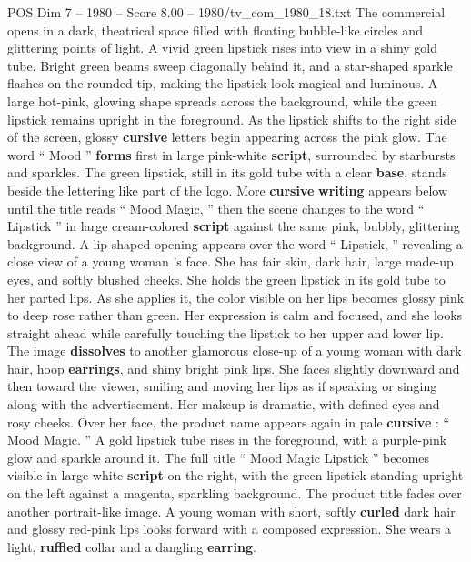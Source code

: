 \begin{textsample}{POS Dim 7 – 1980 – Score 8.00 – 1980/tv\_com\_1980\_18.txt}  \label{ex:f7_pos_041}
The commercial opens in a dark, theatrical space filled with floating bubble-like circles and glittering points of light.
A vivid green lipstick rises into view in a shiny gold tube.
Bright green beams sweep diagonally behind it, and a star-shaped sparkle flashes on the rounded tip, making the lipstick look magical and luminous.
A large hot-pink, glowing shape spreads across the background, while the green lipstick remains upright in the foreground.
As the lipstick shifts to the right side of the screen, glossy \textbf{cursive} letters begin appearing across the pink glow.
The word “ Mood ” \textbf{forms} first in large pink-white \textbf{script}, surrounded by starbursts and sparkles.
The green lipstick, still in its gold tube with a clear \textbf{base}, stands beside the lettering like part of the logo.
More \textbf{cursive} \textbf{writing} appears below until the title reads “ Mood Magic, ” then the scene changes to the word “ Lipstick ” in large cream-colored \textbf{script} against the same pink, bubbly, glittering background.
A lip-shaped opening appears over the word “ Lipstick, ” revealing a close view of a young woman ’s face.
She has fair skin, dark hair, large made-up eyes, and softly blushed cheeks.
She holds the green lipstick in its gold tube to her parted lips.
As she applies it, the color visible on her lips becomes glossy pink to deep rose rather than green.
Her expression is calm and focused, and she looks straight ahead while carefully touching the lipstick to her upper and lower lip.
The image \textbf{dissolves} to another glamorous close-up of a young woman with dark hair, hoop \textbf{earrings}, and shiny bright pink lips.
She faces slightly downward and then toward the viewer, smiling and moving her lips as if speaking or singing along with the advertisement.
Her makeup is dramatic, with defined eyes and rosy cheeks.
Over her face, the product name appears again in pale \textbf{cursive} : “ Mood Magic. ” A gold lipstick tube rises in the foreground, with a purple-pink glow and sparkle around it.
The full title “ Mood Magic Lipstick ” becomes visible in large white \textbf{script} on the right, with the green lipstick standing upright on the left against a magenta, sparkling background.
The product title fades over another portrait-like image.
A young woman with short, softly \textbf{curled} dark hair and glossy red-pink lips looks forward with a composed expression.
She wears a light, \textbf{ruffled} collar and a dangling \textbf{earring}.

\end{textsample}
